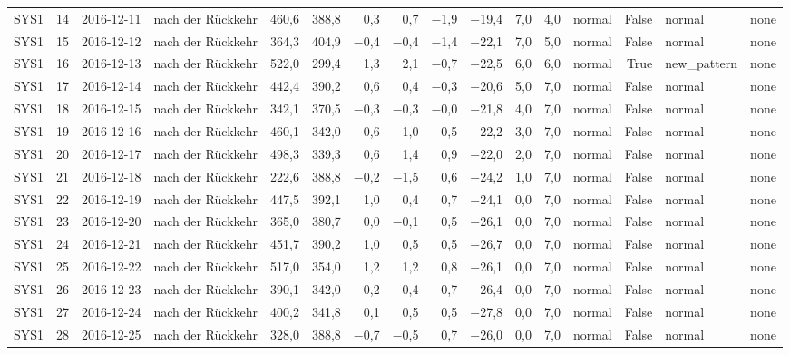 \begin{tabular}{lrllrrrrrrrrlrll}
SYS1 & 14 & 2016-12-11 & nach der Rückkehr & 460,6 & 388,8 & 0,3 & 0,7 & $-$1,9 & $-$19,4 & 7,0 & 4,0 & normal & False & normal & none \\
SYS1 & 15 & 2016-12-12 & nach der Rückkehr & 364,3 & 404,9 & $-$0,4 & $-$0,4 & $-$1,4 & $-$22,1 & 7,0 & 5,0 & normal & False & normal & none \\
SYS1 & 16 & 2016-12-13 & nach der Rückkehr & 522,0 & 299,4 & 1,3 & 2,1 & $-$0,7 & $-$22,5 & 6,0 & 6,0 & normal & True & new\_pattern & none \\
SYS1 & 17 & 2016-12-14 & nach der Rückkehr & 442,4 & 390,2 & 0,6 & 0,4 & $-$0,3 & $-$20,6 & 5,0 & 7,0 & normal & False & normal & none \\
SYS1 & 18 & 2016-12-15 & nach der Rückkehr & 342,1 & 370,5 & $-$0,3 & $-$0,3 & $-$0,0 & $-$21,8 & 4,0 & 7,0 & normal & False & normal & none \\
SYS1 & 19 & 2016-12-16 & nach der Rückkehr & 460,1 & 342,0 & 0,6 & 1,0 & 0,5 & $-$22,2 & 3,0 & 7,0 & normal & False & normal & none \\
SYS1 & 20 & 2016-12-17 & nach der Rückkehr & 498,3 & 339,3 & 0,6 & 1,4 & 0,9 & $-$22,0 & 2,0 & 7,0 & normal & False & normal & none \\
SYS1 & 21 & 2016-12-18 & nach der Rückkehr & 222,6 & 388,8 & $-$0,2 & $-$1,5 & 0,6 & $-$24,2 & 1,0 & 7,0 & normal & False & normal & none \\
SYS1 & 22 & 2016-12-19 & nach der Rückkehr & 447,5 & 392,1 & 1,0 & 0,4 & 0,7 & $-$24,1 & 0,0 & 7,0 & normal & False & normal & none \\
SYS1 & 23 & 2016-12-20 & nach der Rückkehr & 365,0 & 380,7 & 0,0 & $-$0,1 & 0,5 & $-$26,1 & 0,0 & 7,0 & normal & False & normal & none \\
SYS1 & 24 & 2016-12-21 & nach der Rückkehr & 451,7 & 390,2 & 1,0 & 0,5 & 0,5 & $-$26,7 & 0,0 & 7,0 & normal & False & normal & none \\
SYS1 & 25 & 2016-12-22 & nach der Rückkehr & 517,0 & 354,0 & 1,2 & 1,2 & 0,8 & $-$26,1 & 0,0 & 7,0 & normal & False & normal & none \\
SYS1 & 26 & 2016-12-23 & nach der Rückkehr & 390,1 & 342,0 & $-$0,2 & 0,4 & 0,7 & $-$26,4 & 0,0 & 7,0 & normal & False & normal & none \\
SYS1 & 27 & 2016-12-24 & nach der Rückkehr & 400,2 & 341,8 & 0,1 & 0,5 & 0,5 & $-$27,8 & 0,0 & 7,0 & normal & False & normal & none \\
SYS1 & 28 & 2016-12-25 & nach der Rückkehr & 328,0 & 388,8 & $-$0,7 & $-$0,5 & 0,7 & $-$26,0 & 0,0 & 7,0 & normal & False & normal & none \\

\end{tabular}
